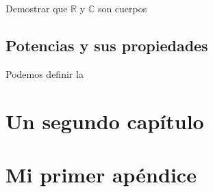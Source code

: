 \begin{ejerci}

Demostrar que $\mathbb{R}$ y $\mathbb{C}$ son cuerpos 

\end{ejerci}



\section{Potencias y sus propiedades}
\begin{defi}
Podemos definir la 
\end{defi}

\chapter{Un segundo cap\'itulo}
%
\minitoc%

\section{}
\section{}


\appendix
\chapter{Mi primer ap\'endice}
